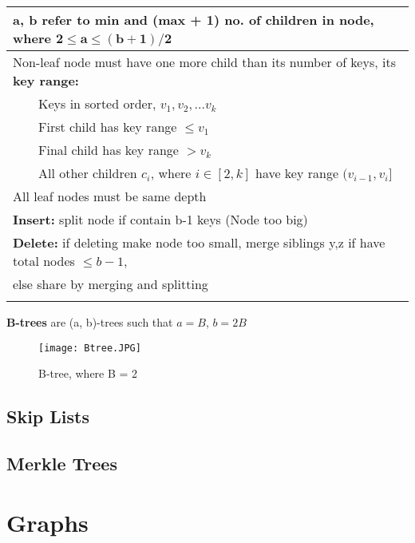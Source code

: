 \documentclass{article}
\newcommand{\tabitem}{~~\llap{\textbullet}~~}
\begin{document}
    \begin{tabular}{l}
        \toprule
        \textbf{a, b refer to min and (max + 1) no. of children in node, where }$\bm{2 \leq a \leq (b+1)/2}$\\
        \midrule
        Non-leaf node must have one more child than its number of keys, its \textbf{key range:}\\
        \tabitem Keys in sorted order, $v_{1}, v_{2},...v_{k}$\\
        \tabitem First child has key range $\leq v_{1}$\\
        \tabitem Final child has key range $> v_{k}$\\
        \tabitem All other children $c_{i}$, where $i \in [2, k]$ have key range $(v_{i-1}, v_{i}]$\\
        \midrule
        All leaf nodes must be same depth\\
        \midrule
        \textbf{Insert:} split node if contain b-1 keys (Node too big)\\
        \midrule
        \textbf{Delete:} if deleting make node too small, merge siblings y,z if have total nodes $\leq b-1$, \\
        else share by merging and splitting\\
        \bottomrule\\
    \end{tabular}

    \noindent\textbf{B-trees} are (a, b)-trees such that $a = B$, $b = 2B$

    \begin{figure}[htbp]
        \begin{center}
        \texttt{[image: Btree.JPG]}
        \caption{B-tree, where B = 2}
        \end{center}
    \end{figure}

    \subsection{Skip Lists}

    \subsection{Merkle Trees}

    \pagebreak

    \section{Graphs}
\end{document}

